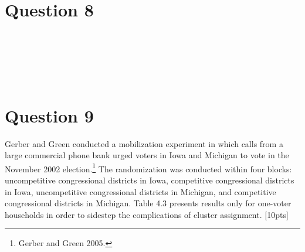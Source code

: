 \documentclass[11pt,notitlepage]{article}\usepackage[]{graphicx}\usepackage[]{color}
\makeatletter
\newenvironment{kframe}{%
 \def\at@end@of@kframe{}%
 \ifinner\ifhmode%
  \def\at@end@of@kframe{\end{minipage}}%
  \begin{minipage}{\columnwidth}%
 \fi\fi%
 \def\FrameCommand##1{\hskip\@totalleftmargin \hskip-\fboxsep
 \colorbox{shadecolor}{##1}\hskip-\fboxsep
     \hskip-\linewidth \hskip-\@totalleftmargin \hskip\columnwidth}%
 \MakeFramed {\advance\hsize-\width
   \@totalleftmargin\z@ \linewidth\hsize
   \@setminipage}}%
 {\par\unskip\endMakeFramed%
 \at@end@of@kframe}
\newenvironment{knitrout}{}{} %
\makeatother
\begin{document}
\section*{Question 8}
\begin{knitrout}
\color{fgcolor}\begin{kframe}
\begin{verbatim}






\end{verbatim}
\end{kframe}
\end{knitrout}


\section*{Question 9}
Gerber and Green conducted a mobilization experiment in which calls from a large commercial phone bank urged voters in Iowa and Michigan to vote in the November 2002 election.\footnote{Gerber and Green 2005.} The randomization was conducted within four blocks: uncompetitive congressional districts in Iowa, competitive congressional districts in Iowa, uncompetitive congressional districts in Michigan, and competitive congressional districts in Michigan. Table 4.3 presents results only for one-voter households in order to sidestep the complications of cluster assignment. [10pts]
\end{document}
